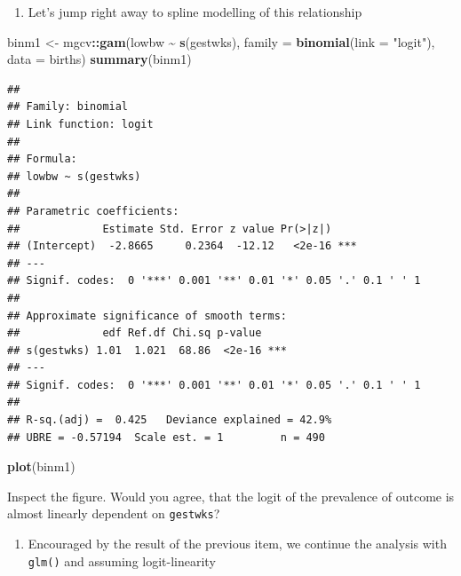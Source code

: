 \documentclass[
]{book}
\newenvironment{Shaded}{\begin{snugshade}}{\end{snugshade}}
\newcommand{\AttributeTok}[1]{\textcolor[rgb]{0.13,0.29,0.53}{#1}}
\newcommand{\FunctionTok}[1]{\textcolor[rgb]{0.13,0.29,0.53}{\textbf{#1}}}
\newcommand{\NormalTok}[1]{#1}
\newcommand{\OtherTok}[1]{\textcolor[rgb]{0.56,0.35,0.01}{#1}}
\newcommand{\SpecialCharTok}[1]{\textcolor[rgb]{0.81,0.36,0.00}{\textbf{#1}}}
\newcommand{\StringTok}[1]{\textcolor[rgb]{0.31,0.60,0.02}{#1}}
\providecommand{\tightlist}{%
  \setlength{\itemsep}{0pt}\setlength{\parskip}{0pt}}
\begin{document}
\begin{enumerate}
\def\labelenumi{\arabic{enumi}.}
\setcounter{enumi}{3}
\tightlist
\item
  Let's jump right away to spline modelling of this relationship
\end{enumerate}

\begin{Shaded}
\begin{Highlighting}[]
\NormalTok{binm1 }\OtherTok{\textless{}{-}}\NormalTok{ mgcv}\SpecialCharTok{::}\FunctionTok{gam}\NormalTok{(lowbw }\SpecialCharTok{\textasciitilde{}} \FunctionTok{s}\NormalTok{(gestwks), }\AttributeTok{family =} \FunctionTok{binomial}\NormalTok{(}\AttributeTok{link =} \StringTok{"logit"}\NormalTok{), }\AttributeTok{data =}\NormalTok{ births)}
\FunctionTok{summary}\NormalTok{(binm1)}
\end{Highlighting}
\end{Shaded}

\begin{verbatim}
## 
## Family: binomial 
## Link function: logit 
## 
## Formula:
## lowbw ~ s(gestwks)
## 
## Parametric coefficients:
##             Estimate Std. Error z value Pr(>|z|)    
## (Intercept)  -2.8665     0.2364  -12.12   <2e-16 ***
## ---
## Signif. codes:  0 '***' 0.001 '**' 0.01 '*' 0.05 '.' 0.1 ' ' 1
## 
## Approximate significance of smooth terms:
##             edf Ref.df Chi.sq p-value    
## s(gestwks) 1.01  1.021  68.86  <2e-16 ***
## ---
## Signif. codes:  0 '***' 0.001 '**' 0.01 '*' 0.05 '.' 0.1 ' ' 1
## 
## R-sq.(adj) =  0.425   Deviance explained = 42.9%
## UBRE = -0.57194  Scale est. = 1         n = 490
\end{verbatim}

\begin{Shaded}
\begin{Highlighting}[]
\FunctionTok{plot}\NormalTok{(binm1)}
\end{Highlighting}
\end{Shaded}

Inspect the figure. Would you agree, that the logit of the prevalence
of outcome is almost linearly dependent on \texttt{gestwks}?

\begin{enumerate}
\def\labelenumi{\arabic{enumi}.}
\setcounter{enumi}{4}
\tightlist
\item
  Encouraged by the result of the previous item, we continue the analysis
  with \texttt{glm()} and assuming logit-linearity
\end{enumerate}
\end{document}
